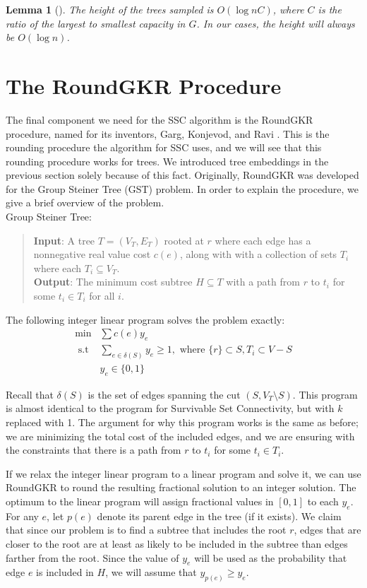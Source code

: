 \documentclass[12pt]{article}
\newtheorem{lemma}{Lemma}
\begin{document}
\begin{lemma}[\cite{ssc}]
\label{thm:height}
The height of the trees sampled is $O(\log nC)$, where $C$ is the ratio of the largest to smallest capacity in $G$. In our cases, the height will always be $O(\log n)$. 
\end{lemma}


\section{The RoundGKR Procedure}

The final component we need for the SSC algorithm is the RoundGKR procedure, named for its inventors, Garg, Konjevod, and Ravi \cite{GKR}. This is the rounding procedure the algorithm for SSC uses, and we will see that this rounding procedure works for trees. We introduced tree embeddings in the previous section solely because of this fact. Originally, RoundGKR was developed for the Group Steiner Tree (GST) problem. In order to explain the procedure, we give a brief overview of the problem. \\

Group Steiner Tree:
\begin{quote}
\textbf{Input}: A tree $T = (V_T, E_T)$ rooted at $r$ where each edge has a nonnegative real value cost $c(e)$, along with with a collection of sets $T_i$ where each $T_i \subseteq V_T$.\\
\textbf{Output}: The minimum cost subtree $H \subseteq T$ with a path from $r$ to $t_i$ for some $t_i \in T_i$ for all $i$.
\end{quote}

The following integer linear program solves the problem exactly:
\begin{align}
\min & \sum c(e) y_e  \\
\text{ s.t } & \sum_{e \in \delta(S)} y_e \geq 1, \text{ where } \{ r \} \subset S, T_i \subset V - S\\
&y_e \in \{0,1\}
\end{align}

Recall that $\delta(S)$ is the set of edges spanning the cut $(S,V_T \setminus S)$. This program is almost identical to the program for Survivable Set Connectivity, but with $k$ replaced with 1. The argument for why this program works is the same as before; we are minimizing the total cost of the included edges, and we are ensuring with the constraints that there is a path from $r$ to $t_i$ for some $t_i \in T_i$.

If we relax the integer linear program to a linear program and solve it, we can use RoundGKR to round the resulting fractional solution to an integer solution. The optimum to the linear program will assign fractional values in $[0,1]$ to each $y_e$. For any $e$, let $p(e)$ denote its parent edge in the tree (if it exists). We claim that since our problem is to find a subtree that includes the root $r$, edges that are closer to the root are at least as likely to be included in the subtree than edges farther from the root. Since the value of $y_e$ will be used as the probability that edge $e$ is included in $H$, we will assume that $y_{p(e)} \geq y_e$. 
\end{document}
